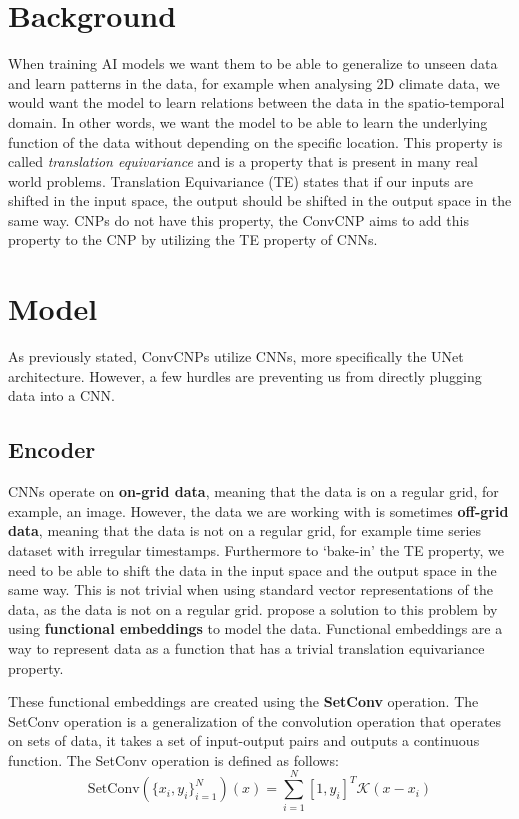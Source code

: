 \documentclass[../../main.tex]{subfiles}
\begin{document}
\section{Background}

When training AI models we want them to be able to generalize to unseen data and learn patterns in the data, for example when analysing 2D climate data, we would want the model to learn relations between the data in the spatio-temporal domain. In other words, we want the model to be able to learn the underlying function of the data without depending on the specific location. This property is called \textit{translation equivariance} and is a property that is present in many real world problems. Translation Equivariance (TE) states that if our inputs are shifted in the input space, the output should be shifted in the output space in the same way. CNPs do not have this property, the ConvCNP aims to add this property to the CNP by utilizing the TE property of CNNs.

\section{Model}

As previously stated, ConvCNPs \cite{gordon2020convolutional} utilize CNNs, more specifically the UNet architecture. However, a few hurdles are preventing us from directly plugging data into a CNN.

\subsection{Encoder}

CNNs operate on \textbf{on-grid data}, meaning that the data is on a regular grid, for example, an image. However, the data we are working with is sometimes \textbf{off-grid data}, meaning that the data is not on a regular grid, for example time series dataset with irregular timestamps. Furthermore to `bake-in' the TE property, we need to be able to shift the data in the input space and the output space in the same way. This is not trivial when using standard vector representations of the data, as the data is not on a regular grid. \cite{gordon2020convolutional} propose a solution to this problem by using \textbf{functional embeddings} to model the data. Functional embeddings are a way to represent data as a function that has a trivial translation equivariance property. 


These functional embeddings are created using the \textbf{SetConv} operation. The SetConv operation is a generalization of the convolution operation that operates on sets of data, it takes a set of input-output pairs and outputs a continuous function. The SetConv operation is defined as follows:
\begin{equation}
	\text{SetConv}(\{x_i, y_i\}_{i=1}^{N})(x) = \sum_{i=1}^{N} [1, y_i] ^ T \mathcal{K}(x - x_i)
\end{equation}
\end{document}
